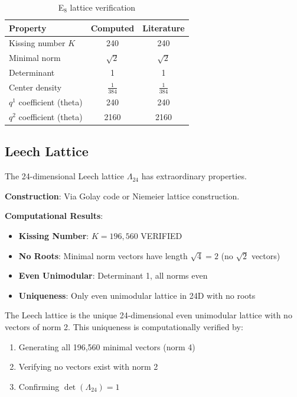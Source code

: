 \begin{table}[H]
\centering
\begin{tabular}{lcc}
\toprule
\textbf{Property} & \textbf{Computed} & \textbf{Literature} \\
\midrule
Kissing number $K$ & 240 & 240 \\
Minimal norm & $\sqrt{2}$ & $\sqrt{2}$ \\
Determinant & 1 & 1 \\
Center density & $\frac{1}{384}$ & $\frac{1}{384}$ \\
$q^1$ coefficient (theta) & 240 & 240 \\
$q^2$ coefficient (theta) & 2160 & 2160 \\
\bottomrule
\end{tabular}
\caption{E$_8$ lattice verification}
\end{table}

\subsection{Leech Lattice}

The 24-dimensional Leech lattice $\Lambda_{24}$ has extraordinary properties.

\textbf{Construction}: Via Golay code or Niemeier lattice construction.

\textbf{Computational Results}:
\begin{itemize}
    \item \textbf{Kissing Number}: $K = 196,560$ \textcolor{validcolor}{VERIFIED}
    \item \textbf{No Roots}: Minimal norm vectors have length $\sqrt{4} = 2$ (no $\sqrt{2}$ vectors)
    \item \textbf{Even Unimodular}: Determinant 1, all norms even
    \item \textbf{Uniqueness}: Only even unimodular lattice in 24D with no roots
\end{itemize}

\begin{example}
The Leech lattice is the unique 24-dimensional even unimodular lattice with no vectors of norm 2. This uniqueness is computationally verified by:
\begin{enumerate}
    \item Generating all 196,560 minimal vectors (norm 4)
    \item Verifying no vectors exist with norm 2
    \item Confirming $\det(\Lambda_{24}) = 1$
\end{enumerate}
\end{example}

